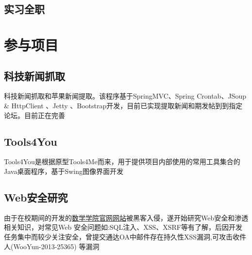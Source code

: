 \documentclass[11pt,a4paper,kai]{moderncv}   %
\begin{document}
\begin{CJK}{UTF8}{kai}
\subsection{实习全职}

\section{参与项目}
\subsection{科技新闻抓取}
科技新闻抓取和苹果新闻提取。该程序基于SpringMVC、Spring Crontab、JSoup \& HttpClient 、Jetty 、Bootstrap开发，目前已实现提取新闻和期发帖到到指定论坛。目前正在完善
\subsection{Tools4You}
 Tools4You是根据原型Tools4Me而来，用于提供项目内部使用的常用工具集合的Java桌面程序，基于Swing图像界面开发
\subsection{Web安全研究}
 由于在校期间的开发的\href{http://www.math.uestc.edu.cn}{数学学院官网网站}被黑客入侵，遂开始研究Web安全和渗透相关知识，对常见Web 安全问题如:SQL注入、XSS、XSRF等有了解，后因开发任务集中而较少关注安全，曾提交通达OA中邮件存在持久性XSS漏洞,可攻击收件人(WooYun-2013-25365) 等漏洞

\end{CJK}
\end{document}
